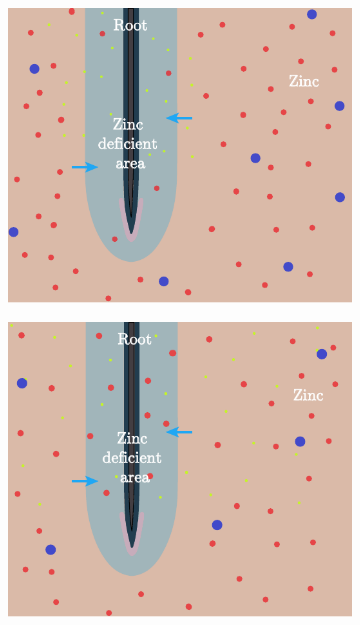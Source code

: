 \documentclass[11pt]{article}
\numberwithin{equation}{section}
\begin{document}
\begin{figure}[h]
\centering
\begin{subfigure}[t]{0.4\textwidth}
    \includegraphics[width=\textwidth]{Figures/RootZincDiagram.pdf}
    \caption{
    }
    \label{fig:Zinc}
\end{subfigure}
\qquad
\begin{subfigure}[t]{0.4\textwidth}
    \includegraphics[width=\textwidth]{Figures/RootZincDiagram2.pdf}

\end{subfigure}
\end{figure}
\end{document}
